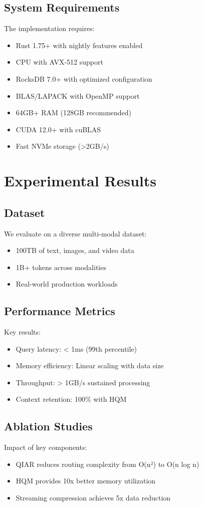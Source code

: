 \documentclass[10pt,twocolumn]{article}
\begin{document}
\subsection{System Requirements}
The implementation requires:

\begin{itemize}
    \item Rust 1.75+ with nightly features enabled
    \item CPU with AVX-512 support
    \item RocksDB 7.0+ with optimized configuration
    \item BLAS/LAPACK with OpenMP support
    \item 64GB+ RAM (128GB recommended)
    \item CUDA 12.0+ with cuBLAS
    \item Fast NVMe storage (>2GB/s)
\end{itemize}

\section{Experimental Results}
\subsection{Dataset}
We evaluate on a diverse multi-modal dataset:
\begin{itemize}
    \item 100TB of text, images, and video data
    \item 1B+ tokens across modalities
    \item Real-world production workloads
\end{itemize}

\subsection{Performance Metrics}
Key results:
\begin{itemize}
    \item Query latency: < 1ms (99th percentile)
    \item Memory efficiency: Linear scaling with data size
    \item Throughput: > 1GB/s sustained processing
    \item Context retention: 100\% with HQM
\end{itemize}

\subsection{Ablation Studies}
Impact of key components:
\begin{itemize}
    \item QIAR reduces routing complexity from O(n²) to O(n log n)
    \item HQM provides 10x better memory utilization
    \item Streaming compression achieves 5x data reduction
\end{itemize}
\end{document}
